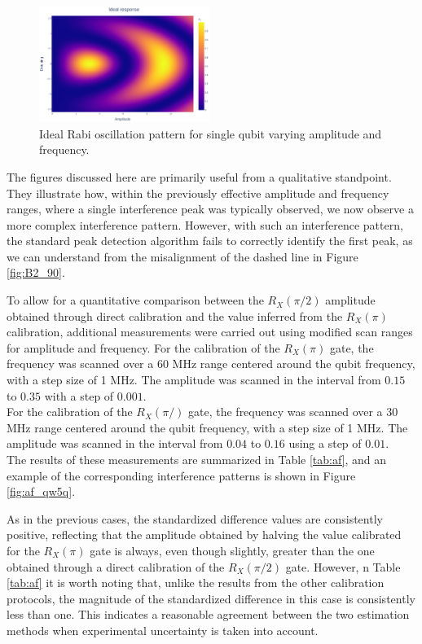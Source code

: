 \begin{figure}[h!]
    \centering
    \includegraphics[width=0.495\textwidth]{figures/png/IdealRX90.png}
    \caption{Ideal Rabi oscillation pattern for single qubit varying amplitude and frequency.}
    \label{fig:expected_RX90}
\end{figure}

The figures discussed here are primarily useful from a qualitative standpoint. 
They illustrate how, within the previously effective amplitude and frequency ranges, where a single interference peak was typically observed, we now observe a more complex interference pattern.
However, with such an interference pattern, the standard peak detection algorithm fails to correctly identify the first peak, as we can understand from the misalignment of the dashed line in Figure \ref{fig:B2_90}. 

To allow for a quantitative comparison between the $R_X(\pi/2)$ amplitude obtained through direct calibration and the value inferred from the $R_X(\pi)$ calibration, additional measurements were carried out using modified scan ranges for amplitude and frequency.
For the calibration of the $R_X(\pi)$ gate, the frequency was scanned over a 60 MHz range centered around the qubit frequency, with a step size of 1 MHz. 
The amplitude was scanned in the interval from $0.15$ to $0.35$ with a step of $0.001$.\\
For the calibration of the $R_X(\pi/)$ gate, the frequency was scanned over a 30 MHz range centered around the qubit frequency, with a step size of 1 MHz. 
The amplitude was scanned in the interval from $0.04$ to $0.16$ using a step of $0.01$.\\
The results of these measurements are summarized in Table \ref{tab:af}, and an example of the corresponding interference patterns is shown in Figure \ref{fig:af_qw5q}.

As in the previous cases, the standardized difference values are consistently positive, reflecting that the amplitude obtained by halving the value calibrated for the $R_X(\pi)$ gate is always, even though slightly, greater than the one obtained through a direct calibration of the $R_X(\pi/2)$ gate.
However, n Table \ref{tab:af} it is worth noting that, unlike the results from the other calibration protocols, the magnitude of the standardized difference in this case is consistently less than one. 
This indicates a reasonable agreement between the two estimation methods when experimental uncertainty is taken into account.

